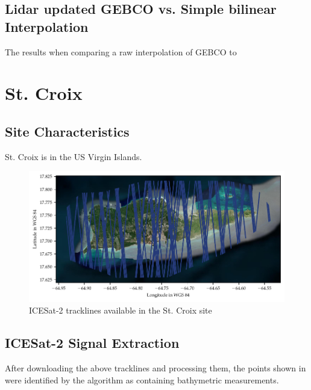 \subsection{Lidar updated GEBCO vs. Simple bilinear Interpolation}
The results when comparing a raw interpolation of GEBCO to
% 



\section{St. Croix}

\subsection{Site Characteristics}

St. Croix is in the US Virgin Islands. 

\begin{figure}[h]
    \centering
    \includegraphics[width=\textwidth]{figures/Stcroix_tracklines.pdf}
    \caption{ICESat-2 tracklines available in the St. Croix site}
    \label{fig:st-croix-tracklines}
\end{figure}

\subsection{ICESat-2 Signal Extraction}
After downloading the above tracklines and processing them, the points shown in were identified by the algorithm as containing bathymetric measurements.

